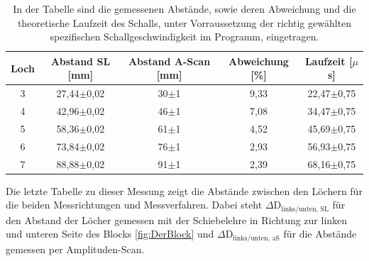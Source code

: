 \documentclass[titlepage = firstcover]{scrartcl}
\begin{document}
            \begin{table}[h]
              \centering
              \caption{In der Tabelle sind die gemessenen Abstände, sowie deren Abweichung und die theoretische Laufzeit des Schalls, unter Vorraussetzung der richtig gewählten spezifischen Schallgeschwindigkeit im Programm, eingetragen.}
              \label{tab:Abstand2}

              \begin{tabular}{c c c c c}
                  \toprule
                  {Loch} & {Abstand SL [mm]} & {Abstand A-Scan [mm]} & {Abweichung [\%]} & {Laufzeit [$\mu$s]}  \\
                  \midrule
                  3   &   27,44$\pm$0,02   &   30$\pm$1  &   9,33    &   22,47$\pm$0,75   \\
                  4   &   42,96$\pm$0,02   &   46$\pm$1  &   7,08    &   34,47$\pm$0,75   \\
                  5   &   58,36$\pm$0,02   &   61$\pm$1  &   4,52    &   45,69$\pm$0,75   \\
                  6   &   73,84$\pm$0,02   &   76$\pm$1  &   2,93    &   56,93$\pm$0,75   \\
                  7   &   88,88$\pm$0,02   &   91$\pm$1  &   2,39    &   68,16$\pm$0,75   \\       
                  \bottomrule
              \end{tabular}

            \end{table}

            \FloatBarrier
            \noindent
            Die letzte Tabelle zu dieser Messung zeigt die Abstände zwischen den Löchern für die beiden Messrichtungen und Messverfahren. Dabei steht $\Delta \text{D}_{\text{links/unten, SL}}$ für 
            den Abstand der Löcher gemessen mit der Schiebelehre in Richtung zur linken und unteren Seite des Blocks \ref{fig:DerBlock} und $\Delta \text{D}_{\text{links/unten, aS}}$ für die
            Abstände gemessen per Amplituden-Scan.
\end{document}
